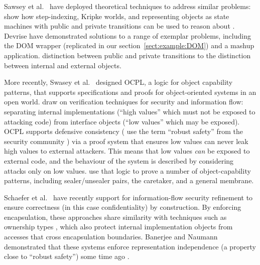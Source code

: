 Sawsey et al.\ \cite{dd}  have deployed
  theoretical techniques to address similar problems:  %
   show how step-indexing, Kripke worlds, and representing objects
as state machines with public and private transitions can be used to
reason about %
.
Devrise have demonstrated solutions to a range of exemplar problems,
including the DOM wrapper (replicated in our
section~\ref{sect:example:DOM}) and a mashup application.
 distinction
between public and private transitions %
 to the
distinction between internal and external objects.

More recently, Swasey et al.\ \cite{ddd}  designed OCPL, a logic
for object capability patterns, that supports specifications and
proofs for object-oriented systems in an open world.  
draw on verification techniques for security and
information flow: separating internal implementations (``high values''
which must not be exposed to attacking code) from interface objects
(``low values'' which may be exposed).  OCPL supports defensive
consistency %
( use the term ``robust safety'' from the
security community \cite{Bengtson}) via a proof system that ensures
low values can never leak high values to external attackers. 
This means that low values \textit{can} be exposed to external code,
and the behaviour of the system is described by considering attacks only
on low values.  %
 use that logic to
prove a number of object-capability patterns, including
sealer/unsealer pairs, the caretaker, and a general membrane.

Schaefer et al.\ \cite{schaeferCbC} have recently
  support for information-flow security %
 refinement to ensure correctness (in this case confidentiality) by
construction. 
By enforcing encapsulation,  %
these approaches share similarity with techniques such as
ownership types \cite{ownalias,NobPotVitECOOP98}, which also
protect internal implementation objects from accesses that cross
encapsulation boundaries.  Banerjee and Naumann demonstrated that these
systems enforce representation independence (a property close to
``robust safety'') some time ago \cite{Banerjee:2005}.

